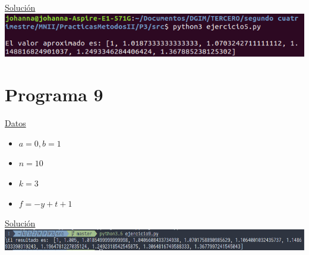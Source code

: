 \documentclass[11pt]{article}
\begin{document}
\underline{Solución} \\
\includegraphics[width=1.1\textwidth]{../img/ej5} \\

\section*{Programa 9}
\underline{Datos}
\begin{itemize}

\item $a = 0, b=1$
\item $ n = 10$
\item $ k = 3$
\item $f = -y+t+1$ 
\end{itemize}

\underline{Solución} \\
\includegraphics[width=1.1\textwidth]{../img/ej9} \\
\end{document}
